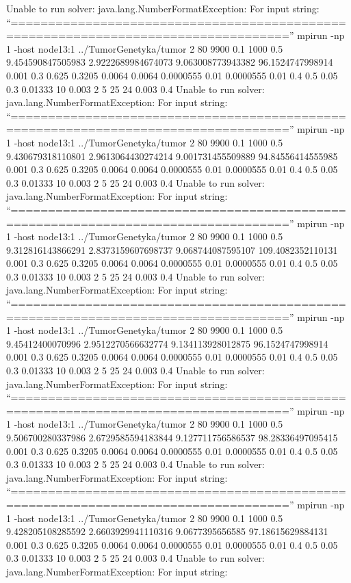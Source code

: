 \documentclass[]{article}
\begin{document}
Unable to run solver: java.lang.NumberFormatException: For input string:
``===================================================================================''
mpirun -np 1 -host node13:1 ../TumorGenetyka/tumor 2 80 9900 0.1 1000
0.5 9.454590847505983 2.9222689984674073 9.063008773943382
96.1524747998914 0.001 0.3 0.625 0.3205 0.0064 0.0064 0.0000555 0.01
0.0000555 0.01 0.4 0.5 0.05 0.3 0.01333 10 0.003 2 5 25 24 0.003 0.4
Unable to run solver: java.lang.NumberFormatException: For input string:
``===================================================================================''
mpirun -np 1 -host node13:1 ../TumorGenetyka/tumor 2 80 9900 0.1 1000
0.5 9.430679318110801 2.9613064430274214 9.001731455509889
94.84556414555985 0.001 0.3 0.625 0.3205 0.0064 0.0064 0.0000555 0.01
0.0000555 0.01 0.4 0.5 0.05 0.3 0.01333 10 0.003 2 5 25 24 0.003 0.4
Unable to run solver: java.lang.NumberFormatException: For input string:
``===================================================================================''
mpirun -np 1 -host node13:1 ../TumorGenetyka/tumor 2 80 9900 0.1 1000
0.5 9.312816143866291 2.8373159607698737 9.068744087595107
109.4082352110131 0.001 0.3 0.625 0.3205 0.0064 0.0064 0.0000555 0.01
0.0000555 0.01 0.4 0.5 0.05 0.3 0.01333 10 0.003 2 5 25 24 0.003 0.4
Unable to run solver: java.lang.NumberFormatException: For input string:
``===================================================================================''
mpirun -np 1 -host node13:1 ../TumorGenetyka/tumor 2 80 9900 0.1 1000
0.5 9.45412400070996 2.9512270566632774 9.134113928012875
96.1524747998914 0.001 0.3 0.625 0.3205 0.0064 0.0064 0.0000555 0.01
0.0000555 0.01 0.4 0.5 0.05 0.3 0.01333 10 0.003 2 5 25 24 0.003 0.4
Unable to run solver: java.lang.NumberFormatException: For input string:
``===================================================================================''
mpirun -np 1 -host node13:1 ../TumorGenetyka/tumor 2 80 9900 0.1 1000
0.5 9.506700280337986 2.6729585594183844 9.127711756586537
98.28336497095415 0.001 0.3 0.625 0.3205 0.0064 0.0064 0.0000555 0.01
0.0000555 0.01 0.4 0.5 0.05 0.3 0.01333 10 0.003 2 5 25 24 0.003 0.4
Unable to run solver: java.lang.NumberFormatException: For input string:
``===================================================================================''
mpirun -np 1 -host node13:1 ../TumorGenetyka/tumor 2 80 9900 0.1 1000
0.5 9.428205108285592 2.6603929941110316 9.0677395656585
97.18615629884131 0.001 0.3 0.625 0.3205 0.0064 0.0064 0.0000555 0.01
0.0000555 0.01 0.4 0.5 0.05 0.3 0.01333 10 0.003 2 5 25 24 0.003 0.4
Unable to run solver: java.lang.NumberFormatException: For input string:
\end{document}
